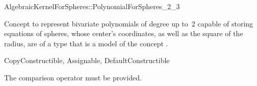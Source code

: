 \begin{ccRefConcept}{AlgebraicKernelForSpheres::PolynomialForSpheres_2_3}

\ccDefinition

Concept to represent
bivariate polynomials of degree up to~2 capable of storing equations
of spheres, whose center's coordinates, as well as the square of the radius, 
are of a type that is a model of the concept
.

\ccRefines
CopyConstructible, Assignable, DefaultConstructible

\ccCreation
{}




\ccOperations

The comparison operator \ccc{==} must be provided. 


\ccHasModels


\ccSeeAlso


\end{ccRefConcept}

